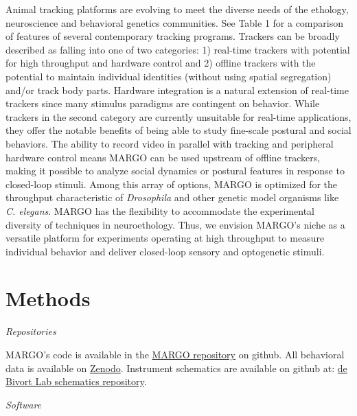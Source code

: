 \documentclass[10pt]{article}
\begin{document}
\begin{multicols}{2}
Animal tracking platforms are evolving to meet the diverse needs of the ethology, neuroscience and behavioral genetics communities. See Table 1 for a comparison of features of several contemporary tracking programs. Trackers can be broadly described as falling into one of two categories: 1) real-time trackers \citep{Fry_TrackFly_2008,Straw_Multi_2010,Chagas_The_2017,Geissmann_Ethoscopes_2017,Mnck_BioTracker_2018,Scaplen_Automated_2019} with potential for high throughput and hardware control and 2) offline trackers \citep{Branson_High_2009,Prez-Escudero_idTracker_2014,Eyjolfsdottir_Detecting_2014,Rodriguez_ToxId_2017,Sridhar_2019,romero-ferrero_2019} with the potential to maintain individual identities (without using spatial segregation) and/or track body parts. Hardware integration is a natural extension of real-time trackers since many stimulus paradigms are contingent on behavior. While trackers in the second category are currently unsuitable for real-time applications, they offer the notable benefits of being able to study fine-scale postural and social behaviors. The ability to record video in parallel with tracking and peripheral hardware control means MARGO can be used upstream of offline trackers, making it possible to analyze social dynamics or postural features in response to closed-loop stimuli. Among this array of options, MARGO is optimized for the throughput characteristic of \textit{Drosophila} and other genetic model organisms like \textit{C. elegans}. MARGO has the flexibility to accommodate the experimental diversity of techniques in neuroethology. Thus, we envision MARGO's niche as a versatile platform for experiments operating at high throughput to measure individual behavior and deliver closed-loop sensory and optogenetic stimuli. 

\section*{Methods}

\noindent\textit{Repositories}
\vspace*{0.3cm}

MARGO's code is available in the \href{https://github.com/de-Bivort-Lab/margo}{MARGO repository} on github. All behavioral data is available on \href{https://zenodo.org/record/2596143#.XI2maRNKiRc}{Zenodo}. Instrument schematics are available on github at: \href{https://github.com/de-Bivort-Lab/dblab-schematics}{de Bivort Lab schematics repository}.


\vspace*{0.5cm}
\noindent\textit{Software}
\vspace*{0.3cm}


\end{multicols}
\end{document}

